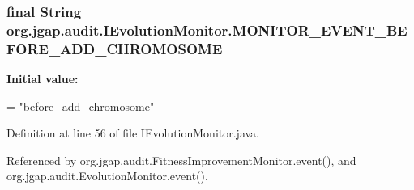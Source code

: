 \hypertarget{interfaceorg_1_1jgap_1_1audit_1_1_i_evolution_monitor_a834f6249a8af5b20e45d42d2db509efa}{
\subsubsection[{M\-O\-N\-I\-T\-O\-R\-\_\-\-E\-V\-E\-N\-T\-\_\-\-B\-E\-F\-O\-R\-E\-\_\-\-A\-D\-D\-\_\-\-C\-H\-R\-O\-M\-O\-S\-O\-M\-E}]{\setlength{\rightskip}{0pt plus 5cm}final String org.\-jgap.\-audit.\-I\-Evolution\-Monitor.\-M\-O\-N\-I\-T\-O\-R\-\_\-\-E\-V\-E\-N\-T\-\_\-\-B\-E\-F\-O\-R\-E\-\_\-\-A\-D\-D\-\_\-\-C\-H\-R\-O\-M\-O\-S\-O\-M\-E\hspace{0.3cm}{\ttfamily [static]}}}\label{interfaceorg_1_1jgap_1_1audit_1_1_i_evolution_monitor_a834f6249a8af5b20e45d42d2db509efa}
{\bfseries Initial value\-:}
\begin{DoxyCode}
=
      \textcolor{stringliteral}{"before\_add\_chromosome"}
\end{DoxyCode}


Definition at line 56 of file I\-Evolution\-Monitor.\-java.



Referenced by org.\-jgap.\-audit.\-Fitness\-Improvement\-Monitor.\-event(), and org.\-jgap.\-audit.\-Evolution\-Monitor.\-event().

